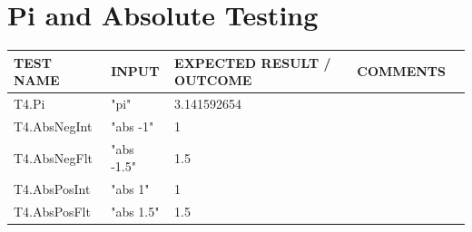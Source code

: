 \documentclass[a4paper, oneside, 11pt]{report}
\begin{document}
    \section{Pi and Absolute Testing}
    \label{PiAbsTest}
    \begin{tabular}{|p{1.5in}|p{1.5in}|p{1.6in}|p{1.6in}|p{2.4in}|}
        \hline
        TEST NAME       & INPUT                     & EXPECTED RESULT / OUTCOME              & COMMENTS                                \\
        \hline
        T4.Pi          & "pi"                                           & 3.141592654                              &                                        \\
        \hline
        T4.AbsNegInt   & "abs -1"                                        & 1                                        &                                        \\
        \hline
        T4.AbsNegFlt   & "abs -1.5"                                      & 1.5                                      &                                        \\
        \hline
        T4.AbsPosInt   & "abs 1"                                         & 1                                        &                                        \\
        \hline
        T4.AbsPosFlt   & "abs 1.5"                                       & 1.5                                      &                                        \\
        \hline
    \end{tabular}
\end{document}
